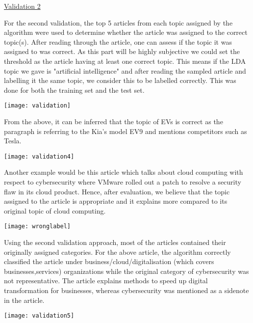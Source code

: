 \documentclass{article}
\begin{document}
\begin{titlepage}
\begin{itemize}
\quad

\underline{Validation 2}       
      
            \quad For the second validation, the top 5 articles from each topic assigned by the algorithm were used to determine whether the article was assigned to the correct topic(s). After reading through the article, one can assess if the topic it was assigned to was correct. As this part will be highly subjective we could set the threshold as the article having at least one correct topic. This means if the LDA topic we gave is "artificial intelligence" and after reading the sampled article and labelling it the same topic, we consider this to be labelled correctly. This was done for both the training set and the test set.
            

\begin{center}
\texttt{[image: validation]}
\end{center}            
            
            \quad From the above, it can be inferred that the topic of EVs is correct as the paragraph is referring to the Kia's model EV9 and mentions competitors such as Tesla. 


\begin{center}
\texttt{[image: validation4]}
\end{center}     
			\quad Another example would be this article which talks about cloud computing with respect to cybersecurity where VMware rolled out a patch to resolve a security flaw in its cloud product. Hence, after evaluation, we believe that the topic assigned to the article is appropriate and it explains more compared to its original topic of cloud computing.
            
\begin{center}
\texttt{[image: wronglabel]}
\end{center} 
            \quad Using the second validation approach, most of the articles contained their originally assigned categories. For the above article, the algorithm correctly classified the article under business/cloud/digitalisation (which covers businesses,services) organizations while the original category of cybersecurity was not representative. The article explains methods to speed up digital transformation for businesses, whereas cybersecurity was mentioned as a sidenote in the article.
            
            \begin{center}
\texttt{[image: validation5]}
\end{center} 


\end{itemize}
\end{titlepage}
\end{document}
